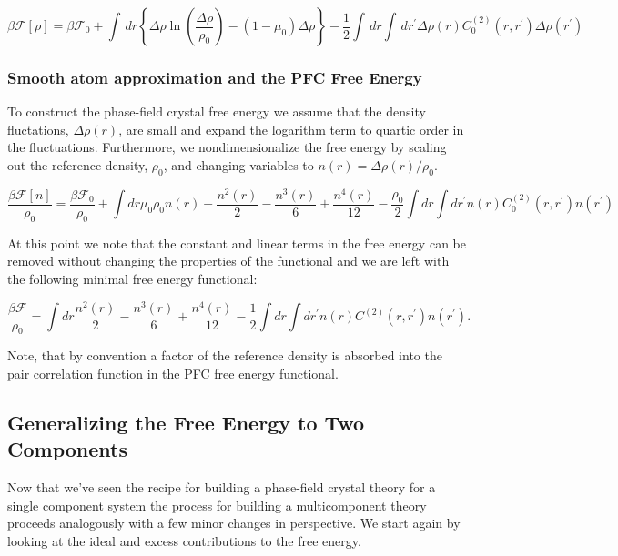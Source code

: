 \documentclass[11pt]{article}
\newcommand{\F}{\mathcal{F}}
\renewcommand{\l}{\left}
\renewcommand{\r}{\right}
\newcommand{\f}{\frac}
\begin{document}
\begin{equation}
    \beta\F[\rho] = \beta\F_0 + \int\,dr \l\lbrace \Delta\rho \ln\l(\f{\Delta\rho}{\rho_0}\r) - (1 - \mu_0)\Delta\rho \r\rbrace
    - \f{1}{2}\int\,dr\int\,dr^\prime \Delta\rho(r) C^{(2)}_0(r, r^\prime) \Delta\rho(r^\prime)
\end{equation}

\subsubsection{Smooth atom approximation and the PFC Free Energy}

To construct the phase-field crystal free energy we assume that the density fluctations, $\Delta\rho(r)$, are small and expand the logarithm term to quartic order in the fluctuations.
Furthermore, we nondimensionalize the free energy by scaling out the reference density, $\rho_0$, and changing variables to $n(r) = \Delta\rho(r)/\rho_0$.

\begin{equation}
    \f{\beta\F[n]}{\rho_0} = \f{\beta\F_0}{\rho_0} +
    \int dr \mu_0 \rho_0 n(r) + \f{n^2(r)}{2} - \f{n^3(r)}{6} + \f{n^4(r)}{12}
    -\f{\rho_0}{2} \int dr \int dr^\prime n(r) C^{(2)}_0(r, r^\prime) n(r^\prime)
\end{equation}

At this point we note that the constant and linear terms in the free energy can be removed without changing the properties of the functional and we are left with the following minimal free energy functional:

\begin{equation}
    \f{\beta\F}{\rho_0} = \int dr \f{n^2(r)}{2} - \f{n^3(r)}{6} + \f{n^4(r)}{12}
    -\f{1}{2} \int dr \int dr^\prime n(r) C^{(2)}(r, r^\prime) n(r^\prime).
\end{equation}

Note, that by convention a factor of the reference density is absorbed into the pair correlation function in the PFC free energy functional.

\subsection{Generalizing the Free Energy to Two Components}
Now that we've seen the recipe for building a phase-field crystal theory for a single component system the process for building a multicomponent theory proceeds analogously with a few minor changes in perspective.
We start again by looking at the ideal and excess contributions to the free energy.
\end{document}
